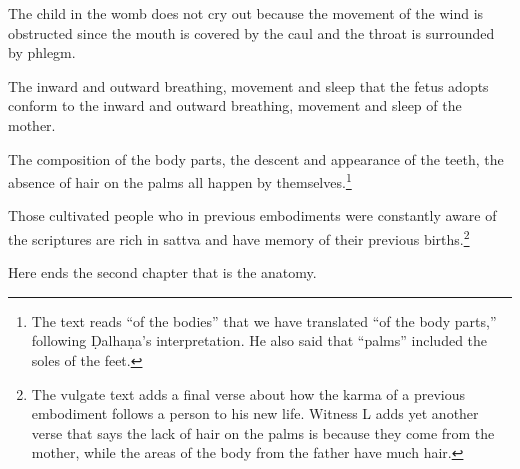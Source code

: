\begin{translation}
The child in the womb does not cry out because the movement of the wind is 
obstructed since the mouth is covered by the caul and the throat is surrounded 
by phlegm. 

\item[55]

The inward and outward breathing, movement and sleep that the fetus adopts
conform to the  inward and outward breathing, movement and 
sleep of the mother.

\item[56]

The composition of the body parts, the descent and appearance of the
teeth, the absence of hair on the palms all happen by
themselves.\footnote{The text reads  “of the bodies”
    that we have translated “of the body parts,” following Ḍalhaṇa's
    interpretation.  He also said that “palms” included the soles of the
    feet.}

\item[57]

Those cultivated people who in previous embodiments were constantly
aware of the scriptures are rich in sattva and have
memory of their previous births.\footnote{The vulgate text adds
    a final verse about how the karma of a previous embodiment 
    follows a person to his new life.  Witness L adds yet another verse 
    that says the lack of hair on the palms is because they come from the 
    mother, while the areas of the body from the father have much hair.}
    
\bigskip

Here ends the second chapter that is the anatomy.
    
%
%
%
%
%
%
%  

\end{translation}
